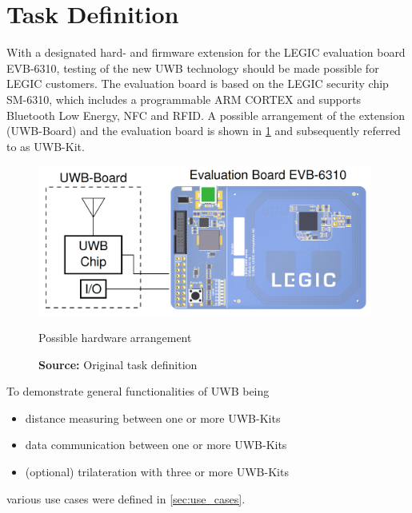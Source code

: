 \section{Task Definition}
With a designated hard- and firmware extension for the LEGIC evaluation board EVB-6310, testing of the new UWB technology should be made possible for LEGIC customers. The evaluation board is based on the LEGIC security chip SM-6310, which includes a programmable ARM CORTEX and supports Bluetooth Low Energy, NFC and RFID. A possible arrangement of the extension (UWB-Board) and the evaluation board is shown in \cref{fig:constellation_HW} and subsequently referred to as UWB-Kit.

\begin{figure}[h!]
	\centering
	\includegraphics[width=11cm]{images/constellation_HW}
	\caption{Possible hardware arrangement}
	\vspace{-2ex}
	\caption*{\textbf{Source:} Original task definition}
	\label{fig:constellation_HW}
\end{figure}

To demonstrate general functionalities of UWB being
\begin{itemize}
	\item distance measuring between one or more UWB-Kits
	\item data communication between one or more UWB-Kits
	\item (optional) trilateration with three or more UWB-Kits
\end{itemize}

various use cases were defined in \cref{sec:use_cases}.






